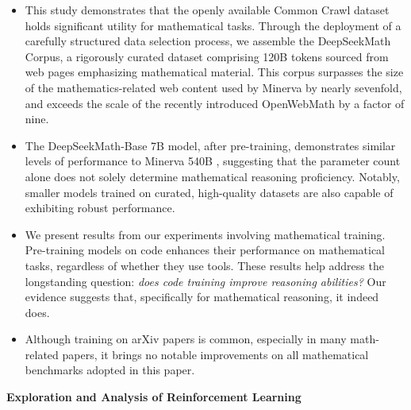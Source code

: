 \begin{itemize}[topsep=0pt]
    \item This study demonstrates that the openly available Common Crawl dataset holds significant utility for mathematical tasks. Through the deployment of a carefully structured data selection process, we assemble the DeepSeekMath Corpus, a rigorously curated dataset comprising 120B tokens sourced from web pages emphasizing mathematical material. This corpus surpasses the size of the mathematics-related web content used by Minerva \citep{minerva} by nearly sevenfold, and exceeds the scale of the recently introduced OpenWebMath \citep{openwebmath} by a factor of nine.

\item The DeepSeekMath-Base 7B model, after pre-training, demonstrates similar levels of performance to Minerva 540B \citep{minerva}, suggesting that the parameter count alone does not solely determine mathematical reasoning proficiency. Notably, smaller models trained on curated, high-quality datasets are also capable of exhibiting robust performance.

\item We present results from our experiments involving mathematical training. Pre-training models on code enhances their performance on mathematical tasks, regardless of whether they use tools. These results help address the longstanding question: \textit{does code training improve reasoning abilities?} Our evidence suggests that, specifically for mathematical reasoning, it indeed does.

    \item Although training on arXiv papers is common, especially in many math-related papers, it brings no notable improvements on all mathematical benchmarks adopted in this paper.
\end{itemize}

\textbf{Exploration and Analysis of Reinforcement Learning}

